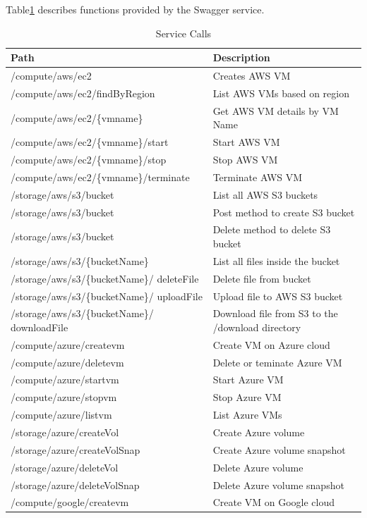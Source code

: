Table\ref{t:serviceFunctions} describes functions provided by the Swagger
service.
\begin{table}[htb]
\centering
\caption{Service Calls}\label{t:serviceFunctions}
\begin{tabular} {p{5cm}|p{3.5cm}}
Path & Description \\
\toprule
/compute/aws/ec2    & Creates AWS VM \\
/compute/aws/ec2/findByRegion & List AWS VMs based on region \\
/compute/aws/ec2/\{vmname\} & Get AWS VM details by VM Name \\
/compute/aws/ec2/\{vmname\}/start & Start AWS VM \\
/compute/aws/ec2/\{vmname\}/stop & Stop AWS VM \\
/compute/aws/ec2/\{vmname\}/terminate & Terminate AWS VM \\
/storage/aws/s3/bucket & List all AWS S3 buckets \\
/storage/aws/s3/bucket & Post method to create S3 bucket \\
/storage/aws/s3/bucket & Delete method to delete S3 bucket \\
/storage/aws/s3/\{bucketName\} & List all files inside the bucket \\
/storage/aws/s3/\{bucketName\}/ deleteFile & Delete file from bucket \\
/storage/aws/s3/\{bucketName\}/ uploadFile & Upload file to AWS S3 bucket \\
/storage/aws/s3/\{bucketName\}/ downloadFile & Download file from S3 to the
/download directory \\
/compute/azure/createvm & Create VM on Azure cloud \\
/compute/azure/deletevm & Delete or teminate Azure VM \\
/compute/azure/startvm & Start Azure VM \\
/compute/azure/stopvm & Stop Azure VM \\
/compute/azure/listvm & List Azure VMs \\
/storage/azure/createVol & Create Azure volume \\
/storage/azure/createVolSnap & Create Azure volume snapshot \\
/storage/azure/deleteVol & Delete Azure volume \\
/storage/azure/deleteVolSnap & Delete Azure volume snapshot \\
/compute/google/createvm & Create VM on Google cloud \\

\end{tabular}
\end{table}
